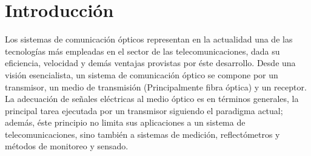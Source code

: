 

\chapter{Introducción}

Los sistemas de comunicación ópticos representan en la actualidad una de las tecnologías más empleadas en el sector de las telecomunicaciones, dada su eficiencia, velocidad y demás ventajas provistas por éste desarrollo. Desde una visión esencialista, un sistema de comunicación óptico se compone por un transmisor, un medio de transmisión (Principalmente fibra óptica) y un receptor.
La adecuación de señales eléctricas al medio óptico es en términos generales, la principal tarea ejecutada por un transmisor siguiendo el paradigma actual; además, éste principio no limita sus aplicaciones a un sistema de telecomunicaciones, sino también a sistemas de medición, reflectómetros y métodos de monitoreo y sensado.
    



